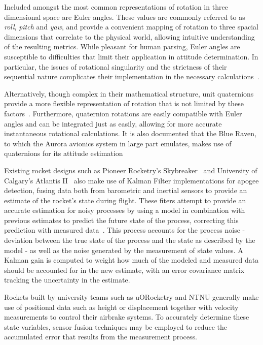 Included amongst the most common representations of rotation in three dimensional space are Euler angles. These values are commonly referred to as \textit{roll}, \textit{pitch} and \textit{yaw}, and provide a convenient mapping of rotation to three spacial dimensions that correlate to the physical world, allowing intuitive understanding of the resulting metrics. While pleasant for human parsing, Euler angles are susceptible to difficulties that limit their application in attitude determination. In particular, the issues of rotational singularity and the strictness of their sequential nature complicates their implementation in the necessary calculations~\cite{Hemingway2018, Diebel2006}.

Alternatively, though complex in their mathematical structure, unit quaternions provide a more flexible representation of rotation that is not limited by these factors~\cite{Diebel2006}. Furthermore, quaternion rotations are easily compatible with Euler angles and can be integrated just as easily, allowing for more accurate instantaneous rotational calculations. It is also documented that the Blue Raven, to which the Aurora avionics system in large part emulates, makes use of quaternions for its attitude estimation~\cite{Adamson2023, Adamson2023timeseries}

Existing rocket designs such as Pioneer Rocketry's Skybreaker~\cite{Pioneer2016} and University of Calgary's Atlantis II~\cite{Atlantis2018} also make use of Kalman Filter implementations for apogee detection, fusing data both from barometric and inertial sensors to provide an estimate of the rocket's state during flight. These fiters attempt to provide an accurate estimation for noisy processes by using a model in combination with previous estimates to predict the future state of the process, correcting this prediction with measured data~\cite{Welch1995,kalman1960}. This process accounts for the process noise - deviation between the true state of the process and the state as described by the model - as well as the noise generated by the measurement of state values. A Kalman gain is computed to weight how much of the modeled and measured data should be accounted for in the new estimate, with an error covariance matrix tracking the uncertainty in the estimate.

Rockets built by university teams such as uORocketry and NTNU generally make use of positional data such as height or displacement together with velocity measurements to control their airbrake systems\cite{uORocketry, NTNU}. To accurately determine these state variables, sensor fusion techniques may be employed to reduce the accumulated error that results from the measurement process. 

